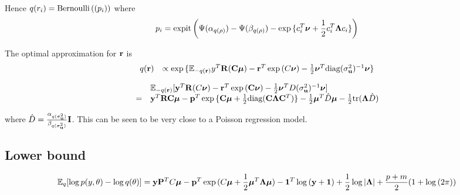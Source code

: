 \documentclass{amsart}
\begin{document}
Hence $q(r_i) = {\text{Bernoulli} \left( (p_i) \right)}$ where
$$
p_i = {\text{expit} \left( \Psi{(\alpha_{q(\rho)})} - \Psi{(\beta_{q(\rho)})} - \exp{\{c_i^T{\boldsymbol\nu}+ {\frac{1}{2}}c_i^T {\boldsymbol\Lambda}c_i\}} \right)}
$$

The optimal approximation for ${\bf r}$ is
$$
\begin{array}{ll}
q({\bf r}) &\propto \exp{\{{\mathbb E}_{-q({\bf r})}y^T{\bf R}({\bf C}{\boldsymbol\mu}) - {\bf r}^T\exp{(C{\boldsymbol\nu})}-{\frac{1}{2}}{\boldsymbol\nu}^T \text{diag}(\sigma_{{\bf u}}^2)^{-1} {\boldsymbol\nu}\}}
\end{array}
$$

$$
\begin{array}{ll}
&{\mathbb E}_{-q({\bf r})} [{\bf y}^T{\bf R}(C{\boldsymbol \nu}) - {\bf r}^T\exp{({\bf C}{\boldsymbol\nu})}-{\frac{1}{2}} {\boldsymbol \nu}^T D(\sigma_{{\bf u}}^2)^{-1} {\boldsymbol \nu}]\\
=&{\bf y}^T{\bf R}{\bf C} {\boldsymbol \mu} - {\bf p}^T \exp{\{{\bf C}{\boldsymbol\mu}+ {\frac{1}{2}}\text{diag}({\bf C}{\boldsymbol\Lambda}{\bf C}^T)\}} - {\frac{1}{2}} {\boldsymbol \mu}^T \hat{D} {\boldsymbol \mu} - {\frac{1}{2}} \text{tr}({\boldsymbol \Lambda} \hat{D})
\end{array}
$$

where $\hat{D} = \frac{\alpha_{q(\sigma_{{\bf u}}^2)}}{\beta_{q(\sigma_{{\bf u}}^2)}} {\bf I}$. This can be seen to be very close to a Poisson
regression model.

\subsection{Lower bound}
$$
{\mathbb E}_q [\log{p(y, \theta)} - \log{q(\theta)}] = 
{\bf y} {\bf P}^T C {\boldsymbol \mu} - {\bf p}^T\exp{(C{\boldsymbol\mu}+ {\frac{1}{2}}{\boldsymbol\mu}^T {\boldsymbol\Lambda}{\boldsymbol\mu})} - {\bf 1}^T\log{({\bf y}+ {\bf1})} +
{\frac{1}{2}} \log{|{\boldsymbol\Lambda}|} + \frac{p + m}{2} (1 + \log{(2 \pi)})
$$

%
%
%
%
\end{document}
